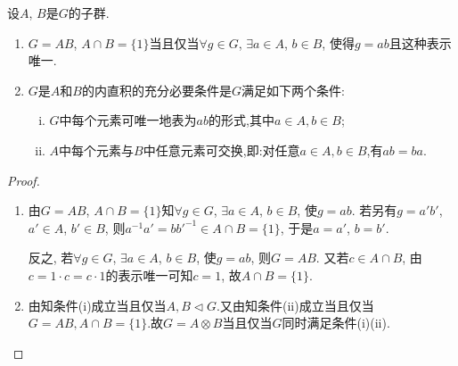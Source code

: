 \documentclass[../../main.tex]{subfiles}%
\begin{document}
\begin{theorem}\label{theorem:抽象代数--定理4.5.3}
设$A$, $B$是$G$的子群.
\begin{enumerate}[(1)]
\item\label{theorem:抽象代数--定理4.5.3-1} $G = AB$, $A\cap B = \{1\}$当且仅当$\forall g\in G$, $\exists a\in A$, $b\in B$, 使得$g = ab$且这种表示唯一.

\item\label{theorem:抽象代数--定理4.5.3-2} $G$是$A$和$B$的内直积的充分必要条件是$G$满足如下两个条件:
\begin{enumerate}[(i)]
\item $G$中每个元素可唯一地表为$ab$的形式,其中$a\in A,b\in B$;
\item $A$中每个元素与$B$中任意元素可交换,即:对任意$a\in A,b\in B$,有$ab=ba$.
\end{enumerate}
\end{enumerate}
\end{theorem}
\begin{proof}
\begin{enumerate}[(1)]
\item 由$G = AB$, $A\cap B = \{1\}$知$\forall g\in G$, $\exists a\in A$, $b\in B$, 使$g = ab$. 若另有$g = a'b'$, $a'\in A$, $b'\in B$, 则$a^{-1}a' = bb'^{-1}\in A\cap B=\{1\}$, 于是$a = a'$, $b = b'$.

反之, 若$\forall g\in G$, $\exists a\in A$, $b\in B$, 使$g = ab$, 则$G = AB$. 又若$c\in A\cap B$, 由$c = 1\cdot c = c\cdot 1$的表示唯一可知$c = 1$, 故$A\cap B = \{1\}$.

\item 由知条件(i)成立当且仅当$A,B\lhd G$.又由知条件(ii)成立当且仅当$G=AB,A\cap B=\{1\}$.故$G=A\otimes B$当且仅当$G$同时满足条件(i)(ii).
\end{enumerate}
\end{proof}
\end{document}
